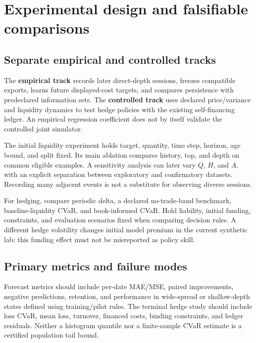 \section{Experimental design and falsifiable comparisons}
\subsection{Separate empirical and controlled tracks}
The \textbf{empirical track} records later direct-depth sessions, freezes compatible exports, learns future displayed-cost targets, and compares persistence with predeclared information sets. The \textbf{controlled track} uses declared price/variance and liquidity dynamics to test hedge policies with the existing self-financing ledger. An empirical regression coefficient does not by itself validate the controlled joint simulator.

The initial liquidity experiment holds target, quantity, time step, horizon, age bound, and split fixed. Its main ablation compares history, top, and depth on common eligible examples. A sensitivity analysis can later vary $Q$, $H$, and $A$, with an explicit separation between exploratory and confirmatory datasets. Recording many adjacent events is not a substitute for observing diverse sessions.

For hedging, compare periodic delta, a declared no-trade-band benchmark, baseline-liquidity CVaR, and book-informed CVaR. Hold liability, initial funding, constraints, and evaluation scenarios fixed when comparing decision rules. A different hedge volatility changes initial model premium in the current synthetic lab; this funding effect must not be misreported as policy skill.

\subsection{Primary metrics and failure modes}
Forecast metrics should include per-date MAE/MSE, paired improvements, negative predictions, retention, and performance in wide-spread or shallow-depth states defined using training/pilot rules. The terminal hedge study should include loss CVaR, mean loss, turnover, financed costs, binding constraints, and ledger residuals. Neither a histogram quantile nor a finite-sample CVaR estimate is a certified population tail bound.

